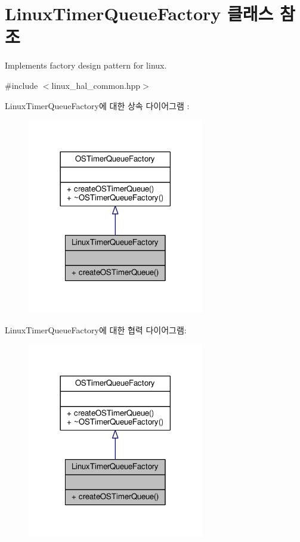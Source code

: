 \hypertarget{class_linux_timer_queue_factory}{}\section{Linux\+Timer\+Queue\+Factory 클래스 참조}
\label{class_linux_timer_queue_factory}


Implements factory design pattern for linux.  




{\ttfamily \#include $<$linux\+\_\+hal\+\_\+common.\+hpp$>$}



Linux\+Timer\+Queue\+Factory에 대한 상속 다이어그램 \+: 
\nopagebreak
\begin{figure}[H]
\begin{center}
\leavevmode
\includegraphics[width=218pt]{class_linux_timer_queue_factory__inherit__graph}
\end{center}
\end{figure}


Linux\+Timer\+Queue\+Factory에 대한 협력 다이어그램\+:
\nopagebreak
\begin{figure}[H]
\begin{center}
\leavevmode
\includegraphics[width=218pt]{class_linux_timer_queue_factory__coll__graph}
\end{center}
\end{figure}
